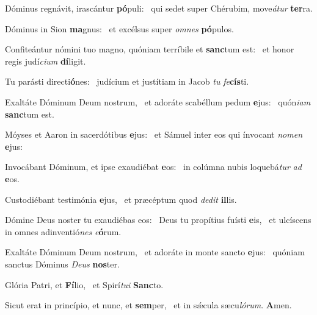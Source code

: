 \item Dóminus regnávit, irascántur \textbf{pó}puli:~\psstar{} qui sedet super Chérubim, move\textit{átur} \textbf{ter}ra.
\item Dóminus in Sion \textbf{ma}gnus:~\psstar{} et excélsus super \textit{omnes} \textbf{pó}pulos.
\item Confiteántur nómini tuo magno, quóniam terríbile et \textbf{sanc}tum est:~\psstar{} et honor regis judí\textit{cium} \textbf{dí}ligit.
\item Tu parásti directi\textbf{ó}nes:~\psstar{} judícium et justítiam in Jacob \textit{tu} \textit{fe}\textbf{cís}ti.
\item Exaltáte Dóminum Deum nostrum,~\pscross{} et adoráte scabéllum pedum \textbf{e}jus:~\psstar{} quón\textit{iam} \textbf{sanc}tum est.
\item Móyses et Aaron in sacerdótibus \textbf{e}jus:~\psstar{} et Sámuel inter eos qui ínvocant \textit{nomen} \textbf{e}jus:
\item Invocábant Dóminum, et ipse exaudiébat \textbf{e}os:~\psstar{} in colúmna nubis loquebá\textit{tur} \textit{ad} \textbf{e}os.
\item Custodiébant testimónia \textbf{e}jus,~\psstar{} et præcéptum quod \textit{dedit} \textbf{il}lis.
\item Dómine Deus noster tu exaudiébas eos:~\pscross{} Deus tu propítius fuísti \textbf{e}is,~\psstar{} et ulcíscens in omnes adinventió\textit{nes} \textit{e}\textbf{ó}rum.
\item Exaltáte Dóminum Deum nostrum,~\pscross{} et adoráte in monte sancto \textbf{e}jus:~\psstar{} quóniam sanctus Dóminus \textit{Deus} \textbf{nos}ter.
\item Glória Patri, et \textbf{Fí}lio,~\psstar{} et Spirí\textit{tui} \textbf{Sanc}to.
\item Sicut erat in princípio, et nunc, et \textbf{sem}per,~\psstar{} et in sǽcula sæcu\textit{lórum}. \textbf{A}men.
